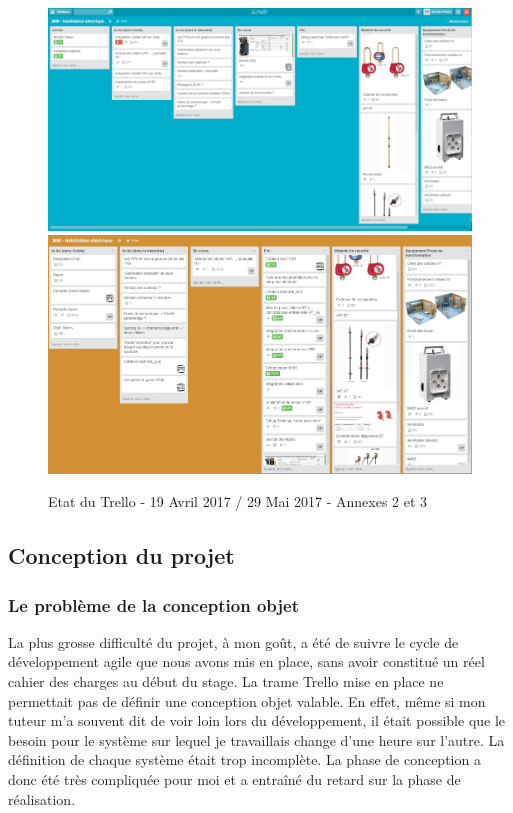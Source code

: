\documentclass[a4paper]{article}
\begin{document}
     \begin{figure}[H]
        \centering
        \includegraphics[scale=0.15]{img/trello1}
        \includegraphics[scale=0.15]{img/trello2}
        \caption{Etat du Trello - 19 Avril 2017 / 29 Mai 2017 - Annexes 2 et 3}
     \end{figure} 

    \subsection{Conception du projet}

    \subsubsection{Le problème de la conception objet}

    La plus grosse difficulté du projet, à mon goût, a été de suivre le cycle de développement agile que nous avons mis en place, sans avoir constitué un réel cahier des charges au début du stage. La trame Trello mise en place ne permettait pas de définir une conception objet valable. En effet, même si mon tuteur m'a souvent dit de voir loin lors du développement, il était possible que le besoin pour le système sur lequel je travaillais change d'une heure sur l'autre. La définition de chaque système était trop incomplète. La phase de conception a donc été très compliquée pour moi et a entraîné du retard sur la phase de réalisation. \\
    
\end{document}
